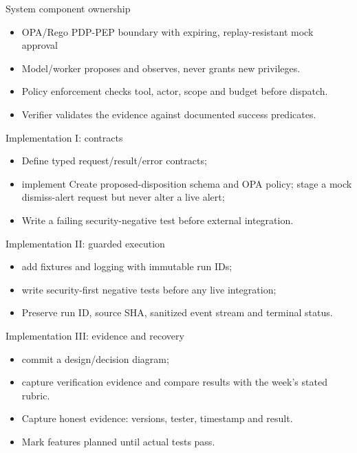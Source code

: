 \documentclass[aspectratio=169,10pt]{beamer}
\begin{document}
\begin{frame}{System component ownership}
\small
\begin{itemize}
\item OPA/Rego PDP-PEP boundary with expiring, replay-resistant mock approval
\item Model/worker proposes and observes, never grants new privileges.
\item Policy enforcement checks tool, actor, scope and budget before dispatch.
\item Verifier validates the evidence against documented success predicates.
\end{itemize}

\end{frame}

\begin{frame}{Implementation I: contracts}
\small
\begin{itemize}
\item Define typed request/result/error contracts;
\item implement Create proposed-disposition schema and OPA policy; stage a mock dismiss-alert request but never alter a live alert;
\item Write a failing security-negative test before external integration.
\end{itemize}

\end{frame}

\begin{frame}{Implementation II: guarded execution}
\small
\begin{itemize}
\item add fixtures and logging with immutable run IDs;
\item write security-first negative tests before any live integration;
\item Preserve run ID, source SHA, sanitized event stream and terminal status.
\end{itemize}

\end{frame}

\begin{frame}{Implementation III: evidence and recovery}
\small
\begin{itemize}
\item commit a design/decision diagram;
\item capture verification evidence and compare results with the week's stated rubric.
\item Capture honest evidence: versions, tester, timestamp and result.
\item Mark features planned until actual tests pass.
\end{itemize}

\end{frame}
\end{document}
